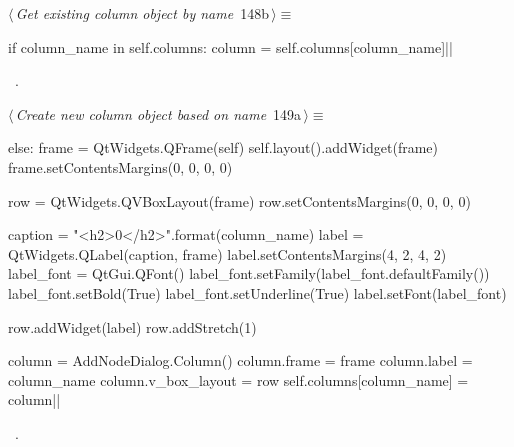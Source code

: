\documentclass[%
    a4paper,    %
    justified,  %
    nobib,      %
    openany     %
]{tufte-book}
\begin{document}
%
\begin{flushleft} \small
\begin{minipage}{\linewidth}\label{scrap158}\raggedright\small
{} $\langle\,${\itshape Get existing column object by name}\nobreak\ {\footnotesize {148b}}$\,\rangle\equiv$
\vspace{-1ex}
\begin{pythoncode}
if column_name in self.columns:
    column = self.columns[column_name]|\NWsep|
\end{pythoncode}
\vspace{1.5ex}
\footnotesize
\begin{list}{}{\setlength{\itemsep}{-\parsep}\setlength{\itemindent}{-\leftmargin}}
\item \NWtxtMacroRefIn\ .

\item{}
\end{list}
\end{minipage}\vspace{4ex}
\end{flushleft}
%
\begin{flushleft} \small
\begin{minipage}{\linewidth}\label{scrap159}\raggedright\small
{} $\langle\,${\itshape Create new column object based on name}\nobreak\ {\footnotesize {149a}}$\,\rangle\equiv$
\vspace{-1ex}
\begin{pythoncode}
else:
    frame = QtWidgets.QFrame(self)
    self.layout().addWidget(frame)
    frame.setContentsMargins(0, 0, 0, 0)

    row = QtWidgets.QVBoxLayout(frame)
    row.setContentsMargins(0, 0, 0, 0)

    caption = "<h2>{0}</h2>".format(column_name)
    label = QtWidgets.QLabel(caption, frame)
    label.setContentsMargins(4, 2, 4, 2)
    label_font = QtGui.QFont()
    label_font.setFamily(label_font.defaultFamily())
    label_font.setBold(True)
    label_font.setUnderline(True)
    label.setFont(label_font)

    row.addWidget(label)
    row.addStretch(1)

    column = AddNodeDialog.Column()
    column.frame = frame
    column.label = column_name
    column.v_box_layout = row
    self.columns[column_name] = column|\NWsep|
\end{pythoncode}
\vspace{1.5ex}
\footnotesize
\begin{list}{}{\setlength{\itemsep}{-\parsep}\setlength{\itemindent}{-\leftmargin}}
\item \NWtxtMacroRefIn\ .

\item{}
\end{list}
\end{minipage}\vspace{4ex}
\end{flushleft}
\end{document}
